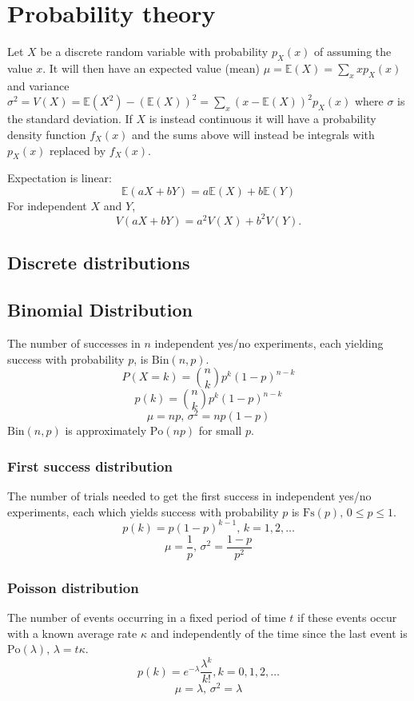 \section{Probability theory}
Let $X$ be a discrete random variable with probability $p_X(x)$ of assuming the value $x$. It will then have an expected value (mean) $\mu=\mathbb{E}(X)=\sum_xxp_X(x)$ and variance $\sigma^2=V(X)=\mathbb{E}(X^2)-(\mathbb{E}(X))^2=\sum_x(x-\mathbb{E}(X))^2p_X(x)$ where $\sigma$ is the standard deviation. If $X$ is instead continuous it will have a probability density function $f_X(x)$ and the sums above will instead be integrals with $p_X(x)$ replaced by $f_X(x)$.

Expectation is linear:
\[\mathbb{E}(aX+bY) = a\mathbb{E}(X)+b\mathbb{E}(Y)\]
For independent $X$ and $Y$, \[V(aX+bY) = a^2V(X)+b^2V(Y).\]

\subsection{Discrete distributions}

\subsection{Binomial Distribution}
\raggedright
The number of successes in $n$ independent yes/no experiments, each yielding success with probability $p$, is $\textrm{Bin}(n,p)$.
\[ P(X=k) = \binom{n}{k}p^k(1-p)^{n-k} \]
\[p(k)=\binom{n}{k}p^k(1-p)^{n-k}\]
\[\mu = np,\,\sigma^2=np(1-p)\]
$\textrm{Bin}(n,p)$ is approximately $\textrm{Po}(np)$ for small $p$.

\subsubsection{First success distribution}
The number of trials needed to get the first success in independent yes/no experiments, each which yields success with probability $p$ is $\textrm{Fs}(p),\,0\leq p\leq1$.
\[p(k)=p(1-p)^{k-1},\,k=1,2,\dots\]
\[\mu = \frac1p,\,\sigma^2=\frac{1-p}{p^2}\]

\subsubsection{Poisson distribution}
The number of events occurring in a fixed period of time $t$ if these events occur with a known average rate $\kappa$ and independently of the time since the last event is $\textrm{Po}(\lambda),\,\lambda=t\kappa$.
\[p(k)=e^{-\lambda}\frac{\lambda^k}{k!}, k=0,1,2,\dots\]
\[\mu=\lambda,\,\sigma^2=\lambda\]

